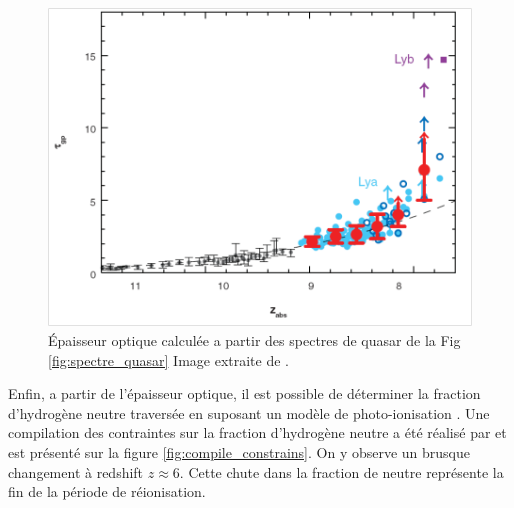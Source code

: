 \begin{figure}
        \includegraphics[width=.95\linewidth]{img/01/epaisseur_optique_quasar.png} 
        \caption[Epaisseur optique Lyman alpha]{%
		Épaisseur optique calculée a partir des spectres de quasar de la Fig\,\ref{fig:spectre_quasar}
        Image extraite de \cite{fan_constraining_2006}.}
 		\label{fig:epaisseur_optique_quasar}
\end{figure}


Enfin, a partir de l'épaisseur optique, il est possible de déterminer la fraction d'hydrogène neutre traversée en suposant un modèle de photo-ionisation \citep{miralda-escude_reionization_2000}.
Une compilation des contraintes sur la fraction d'hydrogène neutre a été réalisé par \cite{2015ApJ...811..140B} et est présenté sur la figure \ref{fig:compile_constrains}.
On y observe un brusque changement à redshift $z\approx6$.
Cette chute dans la fraction de neutre représente la fin de la période de réionisation.

